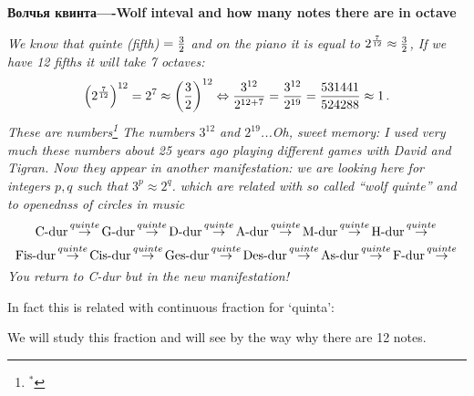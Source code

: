 




\def\p {\partial}
\def\a {\alpha}

  \centerline{\bf   Волчья квинта----Wolf inteval and
  how many notes there are in octave}

\bigskip
 
  {\it We know that quinte (fifth) $={3\over 2}$ and on the piano
 it is equal to   $2^{7\over 12}\approx {3\over 2}$,
If we have 12 fifths it will take 7 octaves:
              $$
 \left(2^{7\over 12}\right)^{12}=2^7
  \approx  \left(3\over 2\right)^{12}\Leftrightarrow
   {3^{12}\over 2^{12+7}}=
   {3^{12}\over 2^{19}}={531441\over 524288}\approx 1\,.
              $$
 These are numbers\footnote{$^*$}
{The numbers $3^{12}$ and $2^{19}$...Oh, sweet memory:
 I used very much these numbers 
about 25 years ago playing different games
 with David and Tigran.
Now they appear in another manifestation:
  we are looking here for integers $p,q$
such that $3^p\approx 2^q$.}
 which  are related with   
so called ``wolf quinte'' and 
to openednss of circles in music       $$
\hbox{C-dur}\,{\buildrel quinte \over \rightarrow}\,
\hbox{G-dur}\,{\buildrel quinte \over \rightarrow}\,
\hbox{D-dur}\,{\buildrel quinte \over \rightarrow}\,
\hbox{A-dur}\,{\buildrel quinte \over \rightarrow}\,
\hbox{M-dur}\,{\buildrel quinte \over \rightarrow}\,
\hbox{H-dur}\,{\buildrel quinte \over \rightarrow}\,
      $$
      $$
\hbox{Fis-dur}\,{\buildrel quinte \over \rightarrow}\,
\hbox{Cis-dur}\,{\buildrel quinte \over \rightarrow}\,
\hbox{Ges-dur}\,{\buildrel quinte \over \rightarrow}\,
\hbox{Des-dur}\,{\buildrel quinte \over \rightarrow}\,
\hbox{As-dur}\,{\buildrel quinte \over \rightarrow}\,
\hbox{F-dur}\,{\buildrel quinte \over \rightarrow}\,
       $$
You return to C-dur but in the new manifestation!


In fact this is related with continuous fraction for `quinta':

We will study this fraction and will see by the way why there
are 12 notes.}

\bigskip

